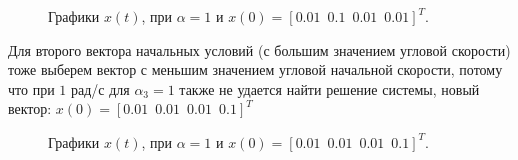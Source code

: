 \begin{figure}[!h]
\caption{Графики $x(t)$, при $\alpha = 1$ и $x(0) = [0.01\, \, \,  0.1\, \, \, 0.01\, \, \, 0.01]^T$.}
\label{4_3_1_1}
\end{figure}

Для второго вектора начальных условий (с большим значением угловой скорости) тоже выберем вектор с меньшим значением угловой начальной скорости, потому что при $1$ рад/с для $\alpha_3 = 1$ также не удается найти решение системы, новый вектор: $x(0) = [0.01\, \, \,  0.01\, \, \, 0.01\, \, \, 0.1]^T$

\begin{figure}[!h]
\caption{Графики $x(t)$, при $\alpha = 1$ и $x(0) = [0.01\, \, \,  0.01\, \, \, 0.01\, \, \, 0.1]^T$.}
\label{4_3_1_2}
\end{figure}


